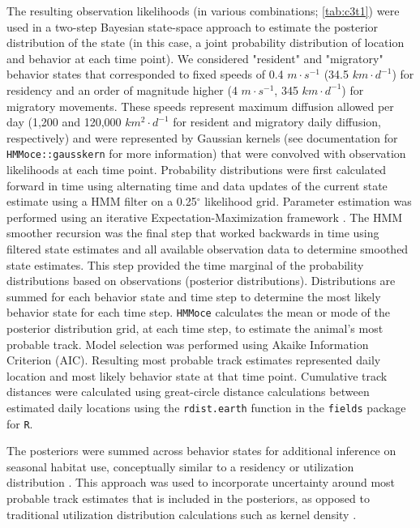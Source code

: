 The resulting observation likelihoods (in various combinations; \cref{tab:c3t1}) were used in a two-step Bayesian state-space approach to estimate the posterior distribution of the state (in this case, a joint probability distribution of location and behavior at each time point). We considered "resident" and "migratory" behavior states that corresponded to fixed speeds of 0.4 $m \cdot s^{-1}$ (34.5 $km  \cdot d^{-1}$) for residency \citep[following ][]{Curtis2014} and an order of magnitude higher (4 $m \cdot s^{-1}$, 345 $km \cdot d^{-1}$) for migratory movements. These speeds represent maximum diffusion allowed per day (1,200 and 120,000 $km^2 \cdot d^{-1}$ for resident and migratory daily diffusion, respectively) and were represented by Gaussian kernels (see documentation for \texttt{HMMoce::gausskern} for more information) that were convolved with observation likelihoods at each time point. Probability distributions were first calculated forward in time using alternating time and data updates of the current state estimate using a HMM filter on a 0.25$^{\circ}$ likelihood grid. Parameter estimation was performed using an iterative Expectation-Maximization framework \citep{Woillez2016}. The HMM smoother recursion was the final step that worked backwards in time using filtered state estimates and all available observation data to determine smoothed state estimates. This step provided the time marginal of the probability distributions based on observations (posterior distributions). Distributions are summed for each behavior state and time step to determine the most likely behavior state for each time step. \texttt{HMMoce} calculates the mean or mode of the posterior distribution grid, at each time step, to estimate the animal's most probable track. Model selection was performed using Akaike Information Criterion (AIC). Resulting most probable track estimates represented daily location and most likely behavior state at that time point. Cumulative track distances were calculated using great-circle distance calculations between estimated daily locations using the \texttt{rdist.earth} function in the \texttt{fields} \citep{Douglas-Nychka2015} package for \texttt{R}.

The posteriors were summed across behavior states for additional inference on seasonal habitat use, conceptually similar to a residency \citep[see Eq. 5, ][]{Pedersen2011a} or utilization distribution \citep{Royle2008}. This approach was used to incorporate uncertainty around most probable track estimates that is included in the posteriors, as opposed to traditional utilization distribution calculations such as kernel density \citep[\emph{e.g.}][]{Berumen2014}.

